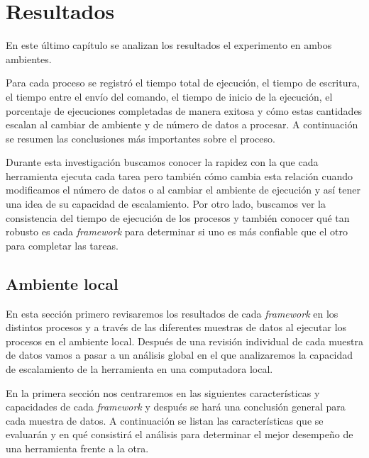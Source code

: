 \chapter{Resultados}

\noindent En este último capítulo se analizan los resultados el experimento en ambos ambientes. 

Para cada proceso se registró el tiempo total de ejecución, el tiempo de escritura, el tiempo entre el envío del comando, el tiempo de inicio de la ejecución, el porcentaje de ejecuciones completadas de manera exitosa y cómo estas cantidades escalan al cambiar de ambiente y de número de datos a procesar. A continuación se resumen las conclusiones más importantes sobre el proceso.

Durante esta investigación buscamos conocer la rapidez con la que cada herramienta ejecuta cada tarea pero también cómo cambia esta relación cuando modificamos el número de datos o al cambiar el ambiente de ejecución y así tener una idea de su capacidad de escalamiento. Por otro lado, buscamos ver la consistencia del tiempo de ejecución de los procesos y también conocer qué tan robusto es cada \textit{framework} para determinar si uno es más confiable que el otro para completar las tareas.

\newpage

\section{Ambiente local}

En esta sección primero revisaremos los resultados de cada \textit{framework} en los distintos procesos y a través de las diferentes muestras de datos al ejecutar los procesos en el ambiente local. Después de una revisión individual de cada muestra de datos vamos a pasar a un análisis global en el que analizaremos la capacidad de escalamiento de la herramienta en una computadora local.

En la primera sección nos centraremos en las siguientes características y capacidades de cada \textit{framework} y después se hará una conclusión general para cada muestra de datos. A continuación se listan las características que se evaluarán y en qué consistirá el análisis para determinar el mejor desempeño de una herramienta frente a la otra.

